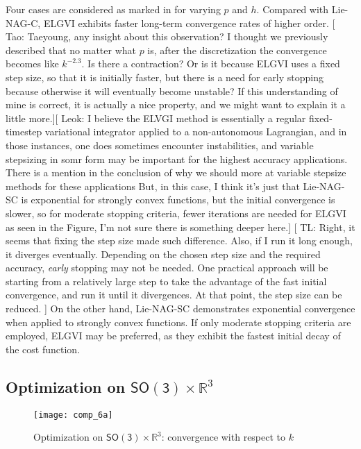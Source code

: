 \documentclass[letterpaper, 10pt, conference]{ieeeconf}
\newcommand{\SO}{\ensuremath{\mathsf{SO(3)}}}
\renewcommand{\Re}{\ensuremath{\mathbb{R}}}
\newcommand{\tao}[1]{[{\color{blue} Tao: #1}]}
\newcommand{\leok}[1]{[{\color{orange} Leok: #1}]}
\newcommand{\EditTL}[1]{[{\color{red} TL: #1}]}
\begin{document}
Four cases are considered as marked in  for varying $p$ and $h$.
Compared with Lie-NAG-C, ELGVI exhibits faster long-term convergence rates of higher order. 
\tao{Taeyoung, any insight about this observation? I thought we previously described that no matter what $p$ is, after the discretization the convergence becomes like $k^{-2.3}$. Is there a contraction? Or is it because ELGVI uses a fixed step size, so that it is initially faster, but there is a need for early stopping because otherwise it will eventually become unstable? If this understanding of mine is correct, it is actually a nice property, and we might want to explain it a little more.}\leok{I believe the ELVGI method is essentially a regular fixed-timestep variational integrator applied to a non-autonomous Lagrangian, and in those instances, one does sometimes encounter instabilities, and variable stepsizing in somr form may be important for the highest accuracy applications. There is a mention in the conclusion of why we should more at variable stepsize methods for these applications  But, in this case, I think it's just that Lie-NAG-SC is exponential for strongly convex functions, but the initial convergence is slower, so for moderate stopping criteria, fewer iterations are needed for ELGVI as seen in the Figure, I'm not sure there is something deeper here.}
\EditTL{Right, it seems that fixing the step size made such difference. Also, if I run it long enough, it diverges eventually. Depending on the chosen step size and the required accuracy, \textit{early} stopping may not be needed. One practical approach will be starting from a relatively large step to take the advantage of the fast initial convergence, and run it until it divergences. At that point, the step size can be reduced. }
On the other hand, Lie-NAG-SC demonstrates exponential convergence when applied to strongly convex functions. 
If only moderate stopping criteria are employed, ELGVI may be preferred, as they exhibit the fastest initial decay of the cost function.

\subsection{Optimization on $\SO\times \Re^3$}

\begin{figure}
    \centerline{
        \texttt{[image: comp\_6a]}
    }
    \caption{Optimization on $\SO\times\Re^3$: convergence with respect to $k$}\label{fig:comp_6}
\end{figure}
\end{document}
